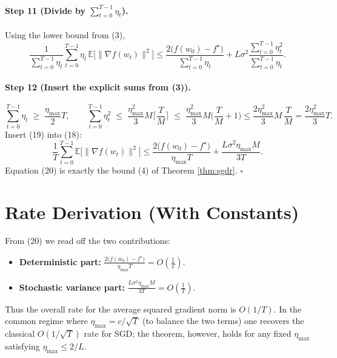 \documentclass{article}
\newcommand{\E}{\mathbb{E}}
\begin{document}
\paragraph{Step 11 (Divide by $\sum_{t=0}^{T-1}\eta_t$).}
Using the lower bound from (3),
\[
\frac{1}{\sum_{t=0}^{T-1}\eta_t}
\sum_{t=0}^{T-1}\eta_t\,\E\!\bigl[\|\nabla f(w_t)\|^{2}\bigr]
\le
\frac{2\bigl(f(w_0)-f^{\star}\bigr)}{\sum_{t=0}^{T-1}\eta_t}
   +L\sigma^{2}\frac{\sum_{t=0}^{T-1}\eta_t^{2}}{\sum_{t=0}^{T-1}\eta_t}.
\tag{18}
\]

\paragraph{Step 12 (Insert the explicit sums from (3)).}
\[
\sum_{t=0}^{T-1}\eta_t\;\ge\;\frac{\eta_{\max}}{2}T,
\qquad
\sum_{t=0}^{T-1}\eta_t^{2}\;\le\;\frac{\eta_{\max}^{2}}{3}M\Big\lceil\frac{T}{M}\Big\rceil
\;\le\;\frac{\eta_{\max}^{2}}{3}M\Big(\frac{T}{M}+1\Big)
\le\frac{2\eta_{\max}^{2}}{3}M\,\frac{T}{M}
= \frac{2\eta_{\max}^{2}}{3}T .
\tag{19}
\]
Insert (19) into (18):
\[
\frac{1}{T}\sum_{t=0}^{T-1}\E\!\bigl[\|\nabla f(w_t)\|^{2}\bigr]
\le
\frac{2\bigl(f(w_0)-f^{\star}\bigr)}{\eta_{\max}T}
   +\frac{L\sigma^{2}\eta_{\max}M}{3T}.
\tag{20}
\]
Equation (20) is exactly the bound (4) of Theorem \ref{thm:sgdr}. \hfill $\square$

\section*{Rate Derivation (With Constants)}
From (20) we read off the two contributions:
\begin{itemize}
    \item \textbf{Deterministic part:} $\displaystyle \frac{2\bigl(f(w_0)-f^{\star}\bigr)}{\eta_{\max}T}=O\!\left(\frac{1}{T}\right)$.
    \item \textbf{Stochastic variance part:} $\displaystyle \frac{L\sigma^{2}\eta_{\max}M}{3T}=O\!\left(\frac{1}{T}\right)$.
\end{itemize}
Thus the overall rate for the average squared gradient norm is $O(1/T)$.  In the common regime where $\eta_{\max}=c/\sqrt{T}$ (to balance the two terms) one recovers the classical $O(1/\sqrt{T})$ rate for SGD; the theorem, however, holds for any fixed $\eta_{\max}$ satisfying $\eta_{\max}\le 2/L$.

\end{document}
